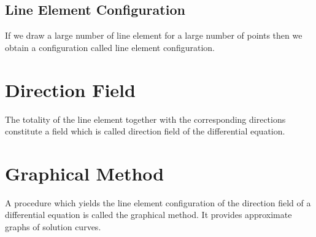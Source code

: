 \documentclass[../main-sheet.tex]{subfiles}
\begin{document}
\subsection{Line Element Configuration}
If we draw a large number of line element for a large number of points then we obtain a configuration called line element configuration.
\section{Direction Field}
The totality of the line element together with the corresponding directions constitute a field which is called direction field of the differential equation.

\section{Graphical Method}
A procedure which yields the line element configuration of the direction field of a differential equation is called the graphical method. It provides approximate graphs of solution curves.
\end{document}
